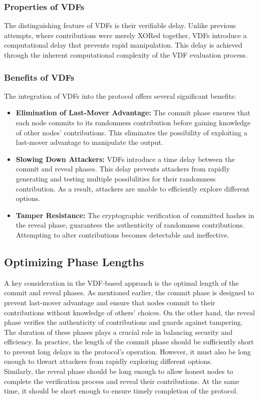 \subsubsection{Properties of VDFs}
The distinguishing feature of VDFs is their verifiable delay. Unlike previous attempts, where contributions were merely XORed together, VDFs introduce a computational delay that prevents rapid manipulation. This delay is achieved through the inherent computational complexity of the VDF evaluation process.

\subsubsection{Benefits of VDFs}
The integration of VDFs into the protocol offers several significant benefits:

\begin{itemize}
    \item \textbf{Elimination of Last-Mover Advantage:} The commit phase ensures that each node commits to its randomness contribution before gaining knowledge of other nodes' contributions. This eliminates the possibility of exploiting a last-mover advantage to manipulate the output.
    
    \item \textbf{Slowing Down Attackers:} VDFs introduce a time delay between the commit and reveal phases. This delay prevents attackers from rapidly generating and testing multiple possibilities for their randomness contribution. As a result, attackers are unable to efficiently explore different options.
    
    \item \textbf{Tamper Resistance:} The cryptographic verification of committed hashes in the reveal phase, guarantees the authenticity of randomness contributions. Attempting to alter contributions becomes detectable and ineffective.
\end{itemize}

\subsection{Optimizing Phase Lengths}
A key consideration in the VDF-based approach is the optimal length of the commit and reveal phases. As mentioned earlier, the commit phase is designed to prevent last-mover advantage and ensure that nodes commit to their contributions without knowledge of others' choices. On the other hand, the reveal phase verifies the authenticity of contributions and guards against tampering.\\
The duration of these phases plays a crucial role in balancing security and efficiency. In practice, the length of the commit phase should be sufficiently short to prevent long delays in the protocol's operation. However, it must also be long enough to thwart attackers from rapidly exploring different options.\\
Similarly, the reveal phase should be long enough to allow honest nodes to complete the verification process and reveal their contributions. At the same time, it should be short enough to ensure timely completion of the protocol.

